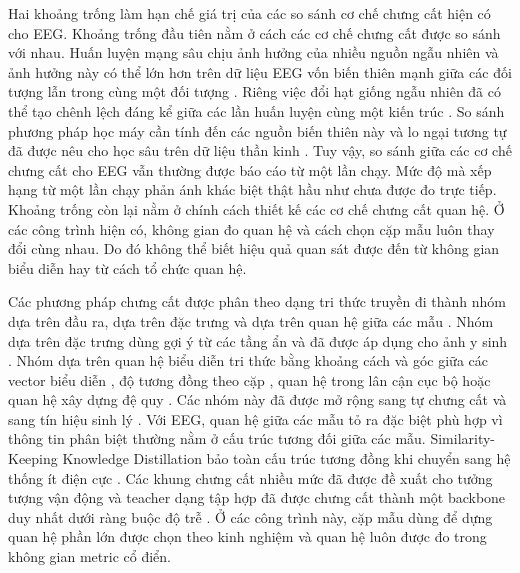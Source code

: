 Hai khoảng trống làm hạn chế giá trị của các so sánh cơ chế chưng cất hiện
có cho EEG. Khoảng trống đầu tiên nằm ở cách các cơ chế chưng cất được so sánh với nhau. Huấn luyện mạng sâu
chịu ảnh hưởng của nhiều nguồn ngẫu nhiên và ảnh hưởng này có thể lớn hơn
trên dữ liệu EEG vốn biến thiên mạnh giữa các đối tượng lẫn trong cùng một
đối tượng \cite{huang2023discrepancy}. Riêng việc đổi hạt giống ngẫu nhiên
đã có thể tạo chênh lệch đáng kể giữa các lần huấn luyện cùng một kiến trúc
\cite{picard2021torch}. So sánh phương pháp học máy cần tính đến các nguồn
biến thiên này \cite{bouthillier2021accounting} và lo ngại tương tự đã được
nêu cho học sâu trên dữ liệu thần kinh \cite{delpup2024toward}. Tuy vậy, so
sánh giữa các cơ chế chưng cất cho EEG vẫn thường được báo cáo từ một lần
chạy. Mức độ mà xếp hạng từ một lần chạy phản ánh khác biệt thật hầu như
chưa được đo trực tiếp. Khoảng trống còn lại nằm ở chính cách thiết kế các cơ chế chưng cất quan hệ. Ở các công trình hiện có, không gian đo quan hệ và cách chọn
cặp mẫu luôn thay đổi cùng nhau. Do đó không thể biết hiệu quả quan sát được
đến từ không gian biểu diễn hay từ cách tổ chức quan hệ.

Các phương pháp chưng cất được phân theo dạng tri thức truyền đi thành nhóm
dựa trên đầu ra, dựa trên đặc trưng và dựa trên quan hệ giữa các mẫu
\cite{gou2021knowledge, mansourian2025comprehensive}. Nhóm dựa trên đặc
trưng dùng gợi ý từ các tầng ẩn \cite{romero2015fitnets} và đã được áp dụng
cho ảnh y sinh \cite{javed2023knowledge}. Nhóm dựa trên quan hệ biểu diễn
tri thức bằng khoảng cách và góc giữa các vector biểu diễn
\cite{park2019relational}, độ tương đồng theo cặp \cite{feng2021double},
quan hệ trong lân cận cục bộ \cite{gou2025neighborhood} hoặc quan hệ xây
dựng đệ quy \cite{ye2021unsupervised}. Các nhóm này đã được mở rộng sang tự chưng cất
\cite{zhang2022selfdistillation, mai2025eegskdnet} và sang tín hiệu sinh lý
\cite{wang2021fldnet, gu2023framelevel, zhang2023distilling,
ibrahim2022knowledge, garcia-salinas2023intrasubject}. Với EEG, quan hệ giữa các mẫu tỏ ra đặc biệt phù hợp vì thông tin phân
biệt thường nằm ở cấu trúc tương đối giữa các mẫu. Similarity-Keeping Knowledge Distillation bảo toàn cấu trúc tương đồng
khi chuyển sang hệ thống ít điện cực \cite{huang2024enhancing}. Các khung
chưng cất nhiều mức đã được đề xuất cho tưởng tượng vận động
\cite{wu2026multilevel} và teacher dạng tập hợp đã được chưng cất thành một
backbone duy nhất dưới ràng buộc độ trễ \cite{xu2026entropy}. Ở các công trình này, cặp mẫu dùng để dựng quan hệ
phần lớn được chọn theo kinh nghiệm và quan hệ luôn được đo trong không gian
metric cổ điển.

